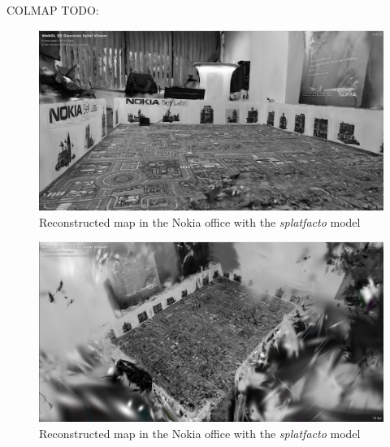 \FloatBarrier
COLMAP TODO:
\begin{figure}[htbp]
	\centering
	\includegraphics[width=150mm, keepaspectratio]{figures_jpg/nokia_splatfacto_1.jpg}
	\caption{Reconstructed map in the Nokia office with the \textit{splatfacto} model}
	\label{fig:nokia_splatfacto_colmap_1}
\end{figure}

\begin{figure}[htbp]
	\centering
	\includegraphics[width=150mm, keepaspectratio]{figures_jpg/nokia_splatfacto_2.jpg}
	\caption{Reconstructed map in the Nokia office with the \textit{splatfacto} model}
	\label{fig:nokia_splatfacto_colmap_2}
\end{figure}



